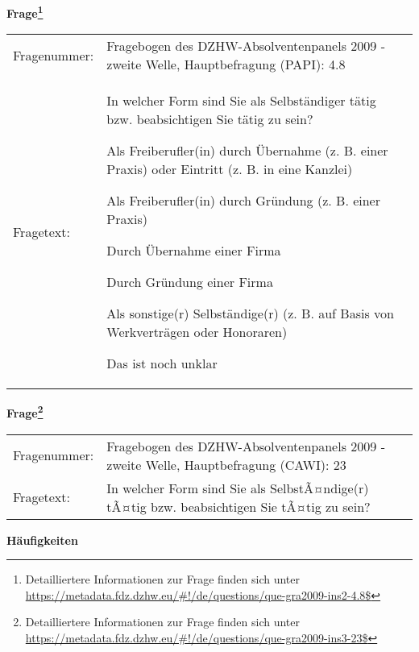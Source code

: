				\vspace*{0.5cm}
                \noindent\textbf{Frage\footnote{Detailliertere Informationen zur Frage finden sich unter
		              \url{https://metadata.fdz.dzhw.eu/\#!/de/questions/que-gra2009-ins2-4.8$}}}\\
				\begin{tabularx}{\hsize}{@{}lX}
					Fragenummer: &
					  Fragebogen des DZHW-Absolventenpanels 2009 - zweite Welle, Hauptbefragung (PAPI):
					  4.8
 \\
					Fragetext: & In welcher Form sind Sie als Selbständiger tätig bzw. beabsichtigen Sie tätig zu sein?\par  Als Freiberufler(in) durch Übernahme (z. B. einer Praxis) oder Eintritt (z. B. in eine Kanzlei)\par  Als Freiberufler(in) durch Gründung (z. B. einer Praxis)\par  Durch Übernahme einer Firma\par  Durch Gründung einer Firma\par  Als sonstige(r) Selbständige(r) (z. B. auf Basis von Werkverträgen oder Honoraren)\par  Das ist noch unklar \\
				\end{tabularx}
				\vspace*{0.5cm}
                \noindent\textbf{Frage\footnote{Detailliertere Informationen zur Frage finden sich unter
		              \url{https://metadata.fdz.dzhw.eu/\#!/de/questions/que-gra2009-ins3-23$}}}\\
				\begin{tabularx}{\hsize}{@{}lX}
					Fragenummer: &
					  Fragebogen des DZHW-Absolventenpanels 2009 - zweite Welle, Hauptbefragung (CAWI):
					  23
 \\
					Fragetext: & In welcher Form sind Sie als SelbstÃ¤ndige(r) tÃ¤tig bzw. beabsichtigen Sie tÃ¤tig zu sein? \\
				\end{tabularx}





        		\vspace*{0.5cm}
                \noindent\textbf{Häufigkeiten}

